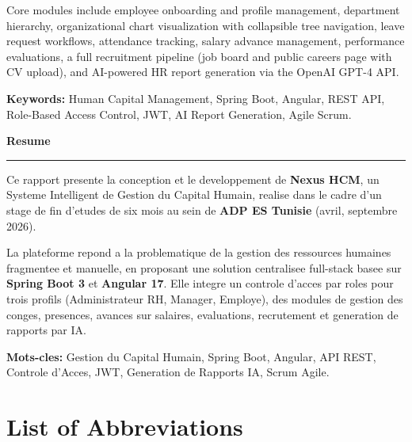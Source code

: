 \documentclass[12pt,a4paper]{report}
\begin{document}
Core modules include employee onboarding and profile management, department hierarchy,
organizational chart visualization with collapsible tree navigation, leave request
workflows, attendance tracking, salary advance management, performance evaluations,
a full recruitment pipeline (job board and public careers page with CV upload), and
AI-powered HR report generation via the OpenAI GPT-4 API.

\textbf{Keywords:} Human Capital Management, Spring Boot, Angular, REST API, Role-Based
Access Control, JWT, AI Report Generation, Agile Scrum.

\vspace{1.5cm}
\begin{center}
{\LARGE\bfseries\color{adpdark} Resume}\\[0.5cm]
{\color{adpred}\rule{6cm}{1pt}}
\end{center}
\vspace{0.8cm}

Ce rapport presente la conception et le developpement de \textbf{Nexus HCM}, un Systeme
Intelligent de Gestion du Capital Humain, realise dans le cadre d'un stage de fin
d'etudes de six mois au sein de \textbf{ADP ES Tunisie} (avril, septembre 2026).

La plateforme repond a la problematique de la gestion des ressources humaines fragmentee
et manuelle, en proposant une solution centralisee full-stack basee sur \textbf{Spring Boot 3}
et \textbf{Angular 17}. Elle integre un controle d'acces par roles pour trois profils
(Administrateur RH, Manager, Employe), des modules de gestion des conges, presences,
avances sur salaires, evaluations, recrutement et generation de rapports par IA.

\textbf{Mots-cles:} Gestion du Capital Humain, Spring Boot, Angular, API REST,
Controle d'Acces, JWT, Generation de Rapports IA, Scrum Agile.

\vfill

\newpage
\tableofcontents
\newpage
\listoffigures
{}
\newpage
\listoftables
{}

\newpage
\chapter*{List of Abbreviations}
\end{document}

